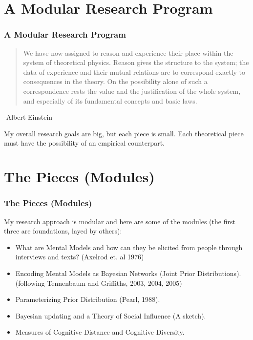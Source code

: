 \documentclass{beamer}
\begin{document}
\section{A Modular Research Program}
\begin{frame}
\frametitle{A Modular Research Program}
\begin{quotation}
We have now assigned to reason and experience their place within the system of theoretical physics. Reason gives the structure to the system; the data of experience and their mutual relations are to correspond exactly to consequences in the theory. On the possibility alone of such a correspondence rests the value and the justification of the whole system, and especially of its fundamental concepts and basic laws.
\end{quotation}
\begin{flushright}
-Albert Einstein
\end{flushright}

My overall research goals are big, but each piece is small. Each theoretical piece must have the possibility of an empirical counterpart.
\end{frame}

\section{The Pieces (Modules)}
\begin{frame}
\frametitle{The Pieces (Modules)}
My research approach is modular and here are some of the modules (the first three are foundations, layed by others):
\begin{itemize}
\item What are Mental Models and how can they be elicited from people through interviews and texts? (Axelrod et. al 1976)
\item Encoding Mental Models as Bayesian Networks (Joint Prior Distributions). (following Tennenbaum and Griffiths, 2003, 2004, 2005)
\item Parameterizing Prior Distribution (Pearl, 1988).
\item Bayesian updating and a Theory of Social Influence (A sketch).
\item Measures of Cognitive Distance and Cognitive Diversity.
\end{itemize}
\end{frame}
\end{document}
